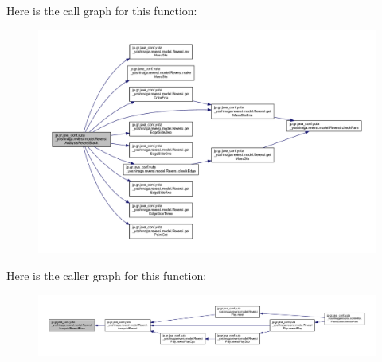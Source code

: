 Here is the call graph for this function\+:
\nopagebreak
\begin{figure}[H]
\begin{center}
\leavevmode
\includegraphics[width=350pt]{classjp_1_1gr_1_1java__conf_1_1yuta__yoshinaga_1_1reversi_1_1model_1_1_reversi_adb74246f49150e02201766a1fa6cf732_cgraph}
\end{center}
\end{figure}
Here is the caller graph for this function\+:
\nopagebreak
\begin{figure}[H]
\begin{center}
\leavevmode
\includegraphics[width=350pt]{classjp_1_1gr_1_1java__conf_1_1yuta__yoshinaga_1_1reversi_1_1model_1_1_reversi_adb74246f49150e02201766a1fa6cf732_icgraph}
\end{center}
\end{figure}
\mbox{\label{classjp_1_1gr_1_1java__conf_1_1yuta__yoshinaga_1_1reversi_1_1model_1_1_reversi_a519adbc5ec3bf5433fdb79bf8049cc75}} 

